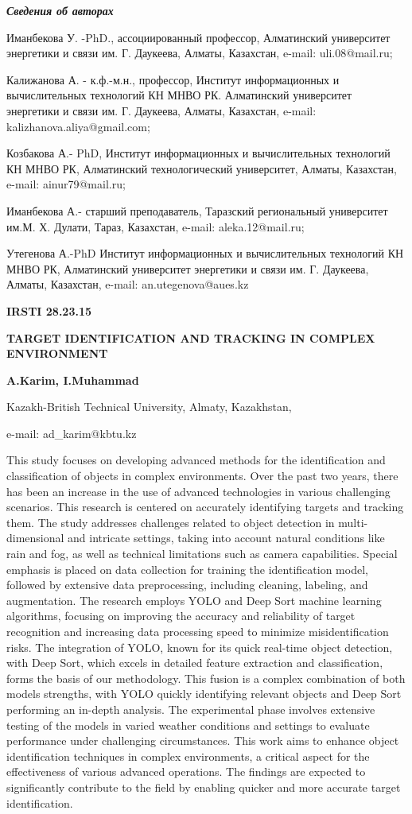 \emph{\textbf{Сведения об авторах}}

Иманбекова У. -PhD., ассоциированный профессор, Алматинский университет
энергетики и связи им. Г. Даукеева, Алматы, Казахстан, e-mail:
uli.08@mail.ru;

Калижанова А. - к.ф.-м.н., профессор, Институт информационных и
вычислительных технологий КН МНВО РК. Алматинский университет энергетики
и связи им. Г. Даукеева, Алматы, Казахстан, e-mail:
kalizhanova.aliya@gmail.com;

Козбакова А.- PhD, Институт информационных и вычислительных технологий
КН МНВО РК, Алматинский технологический университет, Алматы, Казахстан,
e-mail: ainur79@mail.ru;

Иманбекова А.- старший преподаватель, Таразский региональный университет
им.М. Х. Дулати, Тараз, Казахстан, e-mail: aleka.12@mail.ru;

Утегенова А.-PhD Институт информационных и вычислительных технологий КН
МНВО РК, Алматинский университет энергетики и связи им. Г. Даукеева,
Алматы, Казахстан, e-mail: an.utegenova@aues.kz

\textbf{IRSTI 28.23.15}

\textbf{TARGET IDENTIFICATION AND TRACKING IN COMPLEX ENVIRONMENT}

\textbf{A.Karim, I.Muhammad}

Kazakh-British Technical University, Almaty, Kazakhstan,

e-mail: ad\_karim@kbtu.kz

This study focuses on developing advanced methods for the identification
and classification of objects in complex environments. Over the past two
years, there has been an increase in the use of advanced technologies in
various challenging scenarios. This research is centered on accurately
identifying targets and tracking them. The study addresses challenges
related to object detection in multi-dimensional and intricate settings,
taking into account natural conditions like rain and fog, as well as
technical limitations such as camera capabilities. Special emphasis is
placed on data collection for training the identification model,
followed by extensive data preprocessing, including cleaning, labeling,
and augmentation. The research employs YOLO and Deep Sort machine
learning algorithms, focusing on improving the accuracy and reliability
of target recognition and increasing data processing speed to minimize
misidentification risks. The integration of YOLO, known for its quick
real-time object detection, with Deep Sort, which excels in detailed
feature extraction and classification, forms the basis of our
methodology. This fusion is a complex combination of both
models\textquotesingle{} strengths, with YOLO quickly identifying
relevant objects and Deep Sort performing an in-depth analysis. The
experimental phase involves extensive testing of the models in varied
weather conditions and settings to evaluate performance under
challenging circumstances. This work aims to enhance object
identification techniques in complex environments, a critical aspect for
the effectiveness of various advanced operations. The findings are
expected to significantly contribute to the field by enabling quicker
and more accurate target identification.


